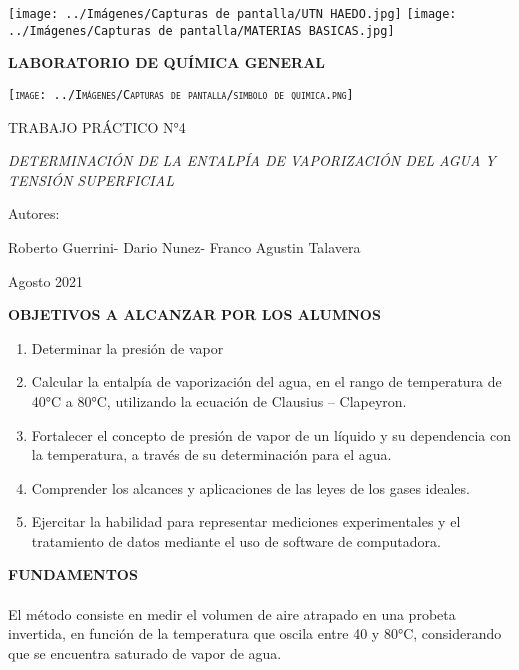\documentclass[10pt,a4paper]{article}
\begin{document}
  	   \thispagestyle{empty}
   
   \begin{titlepage}
\centering
{\texttt{[image: ../Imágenes/Capturas de pantalla/UTN HAEDO.jpg]} \texttt{[image: ../Imágenes/Capturas de pantalla/MATERIAS BASICAS.jpg]}  \par}
\vspace{1cm}
{\bfseries\LARGE LABORATORIO DE QUÍMICA GENERAL \par}
\vspace{1cm}
{\scshape\Large \texttt{[image: ../Imágenes/Capturas de pantalla/simbolo de quimica.png]} \par}
\vspace{3cm}
{\scshape\Huge TRABAJO PRÁCTICO N°4  \par}
\vspace{3cm}
{\itshape\Large DETERMINACIÓN DE LA ENTALPÍA DE VAPORIZACIÓN DEL AGUA Y TENSIÓN SUPERFICIAL \par}
\vfill
{\Large Autores: \par}
{\Large Roberto Guerrini-
	Dario Nunez-
	Franco Agustin Talavera \par}
\vfill
{\Large Agosto 2021 \par}
\end{titlepage}
   
  


\textbf{OBJETIVOS A ALCANZAR POR LOS ALUMNOS} 
	\begin{enumerate}
	\item Determinar la presión de vapor 
	\item Calcular la entalpía de vaporización del agua, en el rango de temperatura de 40°C a 80°C, utilizando la ecuación de Clausius – Clapeyron. 
	\item Fortalecer el concepto de presión de vapor de un líquido y su dependencia con la temperatura, a través de su determinación para el agua. 
	\item Comprender los alcances y aplicaciones de las leyes de los gases ideales. 
	\item Ejercitar la habilidad para representar mediciones experimentales y el tratamiento de datos mediante el uso de software de computadora. 
	\end{enumerate} 
	
\textbf{FUNDAMENTOS} \\ \\

El método consiste en medir el volumen de aire atrapado en una probeta invertida, en función de la temperatura que oscila entre 40 y 80°C, considerando que se encuentra saturado de vapor de agua.  \\ \\
 
\end{document}
